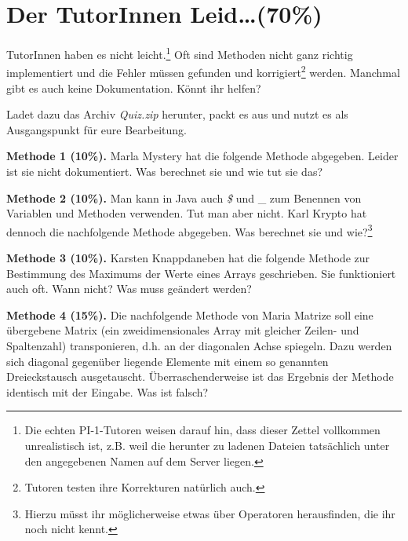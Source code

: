 \documentclass{../pi-aufgabenblatt}
\begin{document}

\section{Der TutorInnen Leid\ldots (70\%)}

TutorInnen haben es nicht leicht.\footnote{Die echten PI-1-Tutoren weisen darauf hin, dass dieser Zettel vollkommen unrealistisch ist, z.B. weil die herunter zu ladenen Dateien tatsächlich unter den angegebenen Namen auf dem Server liegen.} Oft sind Methoden nicht ganz richtig implementiert und die Fehler müssen gefunden und korrigiert\footnote{Tutoren testen ihre Korrekturen natürlich auch.} werden. Manchmal gibt es auch keine Dokumentation. Könnt ihr helfen?

Ladet dazu das Archiv \emph{Quiz.zip} herunter, packt es aus und nutzt es als Ausgangspunkt für eure Bearbeitung.

\textbf{Methode 1 (10\%).} Marla Mystery hat die folgende Methode abgegeben. Leider ist sie nicht dokumentiert. Was berechnet sie und wie tut sie das?



\textbf{Methode 2 (10\%).} Man kann in Java auch \emph{\$} und \_ zum Benennen von Variablen und Methoden verwenden. Tut man aber nicht. Karl Krypto hat dennoch die nachfolgende Methode abgegeben. Was berechnet sie und wie?\footnote{Hierzu müsst ihr möglicherweise etwas über Operatoren herausfinden, die ihr noch nicht kennt.}



\textbf{Methode 3 (10\%).} Karsten Knappdaneben hat die folgende Methode zur Bestimmung des Maximums der Werte eines Arrays geschrieben. Sie funktioniert auch oft. Wann nicht? Was muss geändert werden?



\textbf{Methode 4 (15\%).} Die nachfolgende Methode von Maria Matrize soll eine übergebene Matrix (ein zweidimensionales Array mit gleicher Zeilen- und Spaltenzahl) transponieren, d.h. an der diagonalen Achse spiegeln. Dazu werden sich diagonal gegenüber liegende Elemente mit einem so genannten Dreieckstausch ausgetauscht. Überraschenderweise ist das Ergebnis der Methode identisch mit der Eingabe. Was ist falsch?
\end{document}

